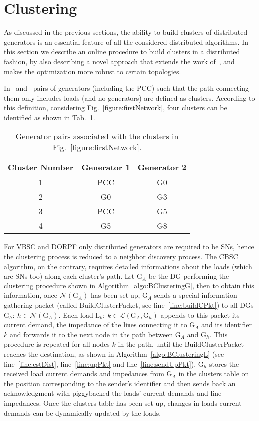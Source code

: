 \documentclass[journal]{IEEEtran}
\newcommand{\fig}[1]{Fig.~\ref{#1}}
\newcommand{\tab}[1]{Tab.~\ref{#1}}
\begin{document}
\section{Clustering}
\label{sec:clustering}

As discussed in the previous sections, the ability to build clusters of distributed generators is an essential feature of all the considered distributed algorithms. In this section we describe an online procedure to build clusters in a distributed fashion, by also describing a novel approach that extends the work of~\cite{SurroundControl}, and makes the optimization more robust to certain topologies. 

In~\cite{SurroundControl} and~\cite{DORPF} pairs of generators (including the PCC) such that the path connecting them only includes loads (and no generators) are defined as clusters. According to this definition, considering \fig{figure:firstNetwork}, four clusters can be identified as shown in \tab{table:GenClusters}.

\begin{table}[ht]
\caption{Generator pairs associated with the clusters in \fig{figure:firstNetwork}.}
\centering
\begin{tabular}{| c | c c |}
\hline
Cluster Number & Generator 1 & Generator 2 \\
\hline\hline
1 & PCC & G0 \\
\hline
2 & G0 & G3 \\
\hline
3 & PCC & G5 \\
\hline
4 & G5 & G8 \\
\hline
\end{tabular}
\label{table:GenClusters}
\end{table}

For VBSC and DORPF only distributed generators are required to be SNs, hence the clustering process is reduced to a neighbor discovery process. 
The CBSC algorithm, on the contrary, requires detailed informations about the loads (which are SNs too) along each cluster's path. Let $\text{G}_A$ be the DG performing the clustering procedure shown in Algorithm~\ref{algo:BClusteringG}, then to obtain this information, once $\mathcal N(\text{G}_A)$ has been set up, $\text{G}_A$ sends a special information gathering packet (called BuildClusterPacket, see line~\ref{line:buildCPkt}) to all DGs $\text{G}_h:\ h\in \mathcal N(\text{G}_A)$. Each load $\text{L}_k:\ k\in\mathcal{L}(\text{G}_A,\text{G}_h)$ appends to this packet its current demand, the impedance of the lines connecting it to $\text{G}_A$ and its identifier $k$ and forwards it to the next node in the path between $\text{G}_A$ and $\text{G}_h$. This procedure is repeated for all nodes $k$ in the path, until the BuildClusterPacket reaches the destination, as shown in Algorithm~\ref{algo:BClusteringL} (see line~\ref{line:estDist}, line~\ref{line:upPkt} and line~\ref{line:sendUpPkt}). $\text{G}_h$ stores the received load current demands and impedances from $\text{G}_A$ in the clusters table on the position corresponding to the sender's identifier and then sends back an acknowledgment with piggybacked the loads' current demands and line impedances. Once the clusters table has been set up, changes in loads current demands can be dynamically updated by the loads. 
\end{document}
